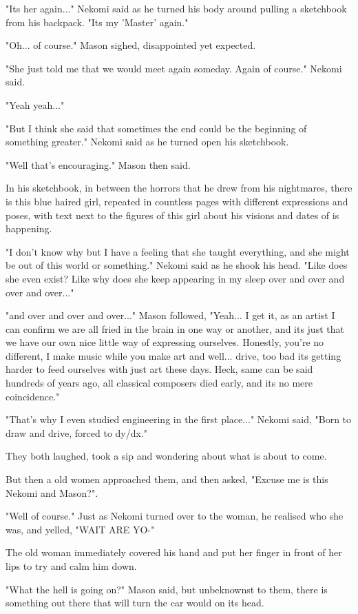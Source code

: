 "Its her again..." Nekomi said as he turned his body around pulling a sketchbook from his backpack. "Its my 'Master' again."

"Oh... of course." Mason sighed, disappointed yet expected. 

"She just told me that we would meet again someday. Again of course." Nekomi said. 

"Yeah yeah..."

"But I think she said that sometimes the end could be the beginning of something greater." Nekomi said as he turned open his sketchbook. 

"Well that's encouraging." Mason then said. 

In his sketchbook, in between the horrors that he drew from his nightmares, there is this blue haired girl, repeated in countless pages with different expressions and poses, with text next to the figures of this girl about his visions and dates of is happening. 

"I don't know why but I have a feeling that she taught everything, and she might be out of this world or something." Nekomi said as he shook his head. "Like does she even exist? Like why does she keep appearing in my sleep over and over and over and over..."

"and over and over and over..." Mason followed, "Yeah... I get it, as an artist I can confirm we are all fried in the brain in one way or another, and its just that we have our own nice little way of expressing ourselves. Honestly, you're no different, I make music while you make art and well... drive, too bad its getting harder to feed ourselves with just art these days. Heck, same can be said hundreds of years ago, all classical composers died early, and its no mere coincidence."

"That's why I even studied engineering in the first place..." Nekomi said, "Born to draw and drive, forced to dy/dx."

They both laughed, took a sip and wondering about what is about to come.

But then a old women approached them, and then asked, "Excuse me is this Nekomi and Mason?". 

"Well of course." Just as Nekomi turned over to the woman, he realised who she was, and yelled, "WAIT ARE YO-"

The old woman immediately covered his hand and put her finger in front of her lips to try and calm him down. 

"What the hell is going on?" Mason said, but unbeknownst to them, there is something out there that will turn the car would on its head.
